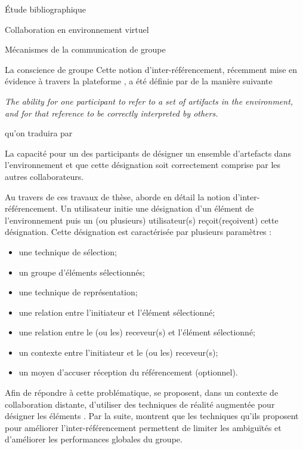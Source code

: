 \documentclass[myfrancais,ngerman,english,french]{mythesis}
\begin{document}
\begin{mychapter}{Étude bibliographique}
\begin{mysection}{Collaboration en environnement virtuel}
\begin{mysubsection}{Mécanismes de la communication de groupe}
\begin{mysubsubsection}{La conscience de groupe}
					Cette notion d'inter-référencement, récemment mise en évidence à travers la plateforme \myAMMPVis {}, a été définie par  de la manière suivante
					\begin{myquote}[english]
						\it The ability for one participant to refer to a set of artifacts in the environment, and for that reference to be correctly interpreted by others.
					\end{myquote}
					qu'on traduira par
					\begin{myquote}[french]
						La capacité pour un des participants de désigner un ensemble d'artefacts dans l'environnement et que cette désignation soit correctement comprise par les autres collaborateurs.
					\end{myquote}

					Au travers de ces travaux de thèse,  aborde en détail la notion d'inter-référencement.
					Un utilisateur initie une désignation d'un élément de l'environnement puis un (ou plusieurs) utilisateur(s) reçoit(reçoivent) cette désignation.
					Cette désignation est caractérisée par plusieurs paramètres :
					\begin{itemize}
						\item une technique de sélection;
						\item un groupe d'éléments sélectionnés;
						\item une technique de représentation;
						\item une relation entre l'initiateur et l'élément sélectionné;
						\item une relation entre le (ou les) receveur(s) et l'élément sélectionné;
						\item un contexte entre l'initiateur et le (ou les) receveur(s);
						\item un moyen d'accuser réception du référencement (optionnel).
					\end{itemize}

					Afin de répondre à cette problématique,  se proposent, dans un contexte de collaboration distante, d'utiliser des techniques de réalité augmentée pour désigner les éléments .
					Par la suite,  montrent que les techniques qu'ils proposent pour améliorer l'inter-référencement permettent de limiter les ambiguïtés et d'améliorer les performances globales du groupe.


\end{mysubsubsection}
\end{mysubsection}
\end{mysection}
\end{mychapter}
\end{document}

